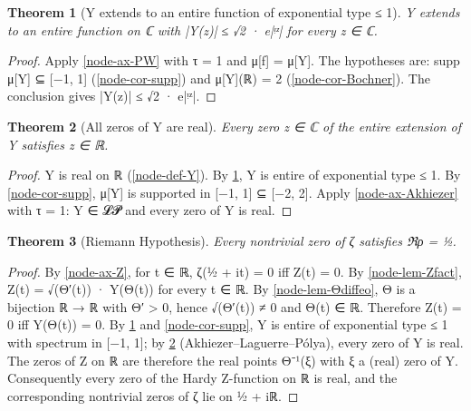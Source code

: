 \documentclass[11pt]{article}
\newtheorem{theorem}{Theorem}
\theoremstyle{definition}
\begin{document}
\begin{theorem}[{Y extends to an entire function of exponential type ≤ 1}]\label{node-thm-Yentire}
Y extends to an entire function on ℂ with |Y(z)| ≤ √2 · e|ᵎᶻ| for every z ∈ ℂ.
\end{theorem}
\begin{proof}
Apply \ref{node-ax-PW} with τ = 1 and μ[f] = μ[Y]. The hypotheses are: supp μ[Y] ⊆ [−1, 1] (\ref{node-cor-supp}) and μ[Y](ℝ) = 2 (\ref{node-cor-Bochner}). The conclusion gives |Y(z)| ≤ √2 · e|ᵎᶻ|.
\end{proof}

\begin{theorem}[{All zeros of Y are real}]\label{node-thm-Yzeros}
Every zero z ∈ ℂ of the entire extension of Y satisfies z ∈ ℝ.
\end{theorem}
\begin{proof}
Y is real on ℝ (\ref{node-def-Y}). By \ref{node-thm-Yentire}, Y is entire of exponential type ≤ 1. By \ref{node-cor-supp}, μ[Y] is supported in [−1, 1] ⊆ [−2, 2]. Apply \ref{node-ax-Akhiezer} with τ = 1: Y ∈ 𝓛𝓟 and every zero of Y is real.
\end{proof}

\begin{theorem}[{Riemann Hypothesis}]\label{node-thm-RH}
Every nontrivial zero of ζ satisfies ℜρ = ½.
\end{theorem}
\begin{proof}
By \ref{node-ax-Z}, for t ∈ ℝ, ζ(½ + it) = 0 iff Z(t) = 0. By \ref{node-lem-Zfact}, Z(t) = √(Θ′(t)) · Y(Θ(t)) for every t ∈ ℝ. By \ref{node-lem-Θdiffeo}, Θ is a bijection ℝ → ℝ with Θ′ > 0, hence √(Θ′(t)) ≠ 0 and Θ(t) ∈ ℝ. Therefore Z(t) = 0 iff Y(Θ(t)) = 0. By \ref{node-thm-Yentire} and \ref{node-cor-supp}, Y is entire of exponential type ≤ 1 with spectrum in [−1, 1]; by \ref{node-thm-Yzeros} (Akhiezer–Laguerre–Pólya), every zero of Y is real. The zeros of Z on ℝ are therefore the real points Θ⁻¹(ξ) with ξ a (real) zero of Y. Consequently every zero of the Hardy Z-function on ℝ is real, and the corresponding nontrivial zeros of ζ lie on ½ + iℝ.
\end{proof}
\end{document}
